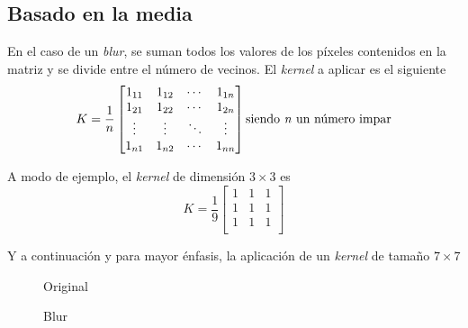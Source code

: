\subsection{Basado en la media}
En el caso de un \emph{blur}, se suman todos los valores de los
píxeles contenidos en la matriz y se divide entre el número de
vecinos. El \emph{kernel} a aplicar es el siguiente
\begin{equation*}
  K = \frac{1}{n}
  \begin{bmatrix}
    1_{11} & 1_{12} & \cdots & 1_{1n} \\
    1_{21} & 1_{22} & \cdots & 1_{2n} \\
    \vdots & \vdots & \ddots & \vdots \\
    1_{n1} & 1_{n2} & \cdots & 1_{nn} \\
  \end{bmatrix}
  \text{siendo \emph{n} un número impar}
\end{equation*}

A modo de ejemplo, el \emph{kernel} de dimensión $3\times3$ es
\begin{equation*}
  K = \frac{1}{9}
  \begin{bmatrix}
    1 & 1 & 1 \\
    1 & 1 & 1 \\
    1 & 1 & 1 \\
  \end{bmatrix}
\end{equation*}

Y a continuación y para mayor énfasis, la aplicación de un
\emph{kernel} de tamaño $7 \times 7$

\begin{figure}[H]
  \caption{Original}
  \centering \setlength\fboxsep{0pt} \setlength\fboxrule{0.5pt}
\end{figure}

\begin{figure}[H]
  \centering \setlength\fboxsep{0pt} \setlength\fboxrule{0.5pt}
  \caption{Blur}
\end{figure}

